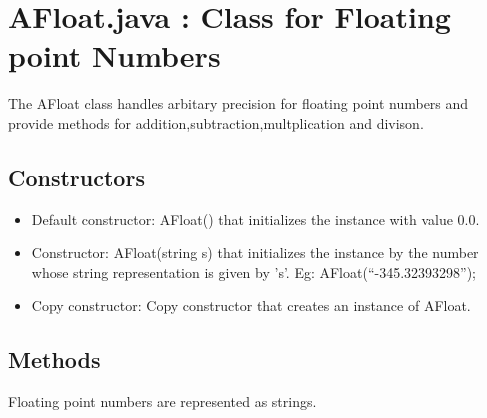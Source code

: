 \documentclass{article}
\begin{document}
\newpage
\section{AFloat.java : Class for Floating point Numbers}
The AFloat class handles arbitary precision for floating point numbers and provide methods for addition,subtraction,multplication and divison.
\subsection*{Constructors}
\begin{itemize}
    \item Default constructor: AFloat() that initializes the instance with value 0.0.
    \item Constructor: AFloat(string s) that initializes the instance by the number whose string representation is given by ’s’. Eg: AFloat(“-345.32393298”);
    \item Copy constructor: Copy constructor that creates an instance of AFloat.
\end{itemize}
\subsection*{Methods}

Floating point numbers are represented as strings.
\end{document}
